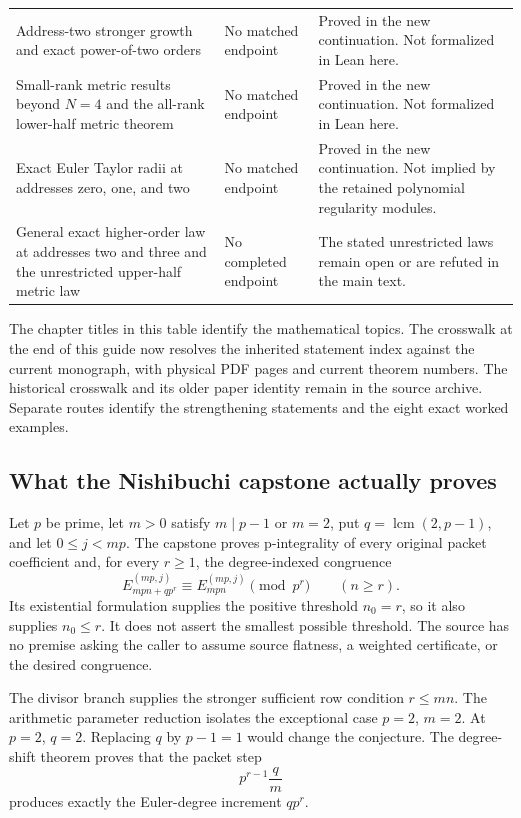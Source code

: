 \begin{longtable}{p{.32\linewidth}p{.30\linewidth}p{.29\linewidth}}
Address-two stronger growth and exact power-of-two orders & No matched endpoint & Proved in the new continuation. Not formalized in Lean here.\\
Small-rank metric results beyond $N=4$ and the all-rank lower-half metric theorem & No matched endpoint & Proved in the new continuation. Not formalized in Lean here.\\
Exact Euler Taylor radii at addresses zero, one, and two & No matched endpoint & Proved in the new continuation. Not implied by the retained polynomial regularity modules.\\
General exact higher-order law at addresses two and three and the unrestricted upper-half metric law & No completed endpoint & The stated unrestricted laws remain open or are refuted in the main text.\\
\bottomrule\end{longtable}

The chapter titles in this table identify the mathematical topics. The crosswalk at the end of this guide now resolves the inherited statement index against the current monograph, with physical PDF pages and current theorem numbers. The historical crosswalk and its older paper identity remain in the source archive. Separate routes identify the strengthening statements and the eight exact worked examples.

\subsection{What the Nishibuchi capstone actually proves}
Let $p$ be prime, let $m>0$ satisfy $m\mid p-1$ or $m=2$, put $q=\operatorname{lcm}(2,p-1)$, and let $0\le j<mp$. The capstone proves p-integrality of every original packet coefficient and, for every $r\ge1$, the degree-indexed congruence
\[
 E_{mpn+qp^r}^{(mp,j)}\equiv E_{mpn}^{(mp,j)}\pmod{p^r}
 \qquad(n\ge r).
\]
Its existential formulation supplies the positive threshold $n_0=r$, so it also supplies $n_0\le r$. It does not assert the smallest possible threshold. The source has no premise asking the caller to assume source flatness, a weighted certificate, or the desired congruence.

The divisor branch supplies the stronger sufficient row condition $r\le mn$. The arithmetic parameter reduction isolates the exceptional case $p=2$, $m=2$. At $p=2$, $q=2$. Replacing $q$ by $p-1=1$ would change the conjecture. The degree-shift theorem proves that the packet step
\[
 p^{r-1}\frac{q}{m}
\]
produces exactly the Euler-degree increment $qp^r$.

